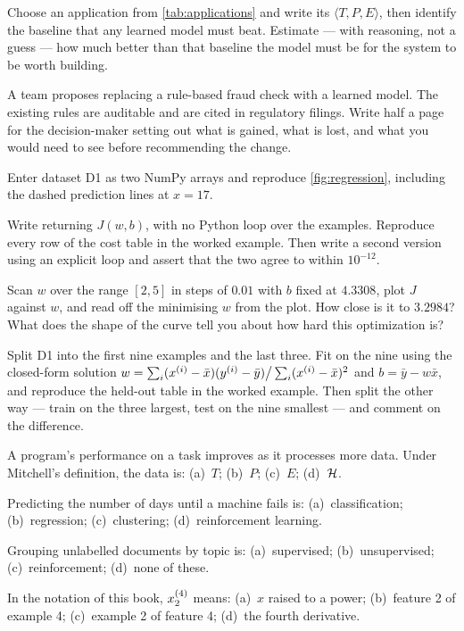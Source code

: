 \dpr Choose an application from \cref{tab:applications} and write its
$\langle T, P, E\rangle$, then identify the baseline that any learned model must
beat. Estimate --- with reasoning, not a guess --- how much better than that
baseline the model must be for the system to be worth building.

\dpr A team proposes replacing a rule-based fraud check with a learned model.
The existing rules are auditable and are cited in regulatory filings. Write half
a page for the decision-maker setting out what is gained, what is lost, and what
you would need to see before recommending the change.


\pe Enter dataset D1 as two NumPy arrays and reproduce \cref{fig:regression},
including the dashed prediction lines at $x = 17$.

\pe Write  returning $J(w,b)$, with no Python loop over
the examples. Reproduce every row of the cost table in the worked example. Then
write a second version using an explicit loop and assert that the two agree to
within $10^{-12}$.

\pe Scan $w$ over the range $[2, 5]$ in steps of $0.01$ with $b$ fixed at
$4.3308$, plot $J$ against $w$, and read off the minimising $w$ from the plot.
How close is it to $3.2984$? What does the shape of the curve tell you about how
hard this optimization is?

\pe Split D1 into the first nine examples and the last three. Fit on the nine
using the closed-form solution
$w = \sum_i (x^{(i)}-\bar x)(y^{(i)}-\bar y) \big/ \sum_i (x^{(i)}-\bar x)^2$
and $b = \bar y - w\bar x$, and reproduce the held-out table in the worked
example. Then split the other way --- train on the three largest, test on the
nine smallest --- and comment on the difference.


\qz A program's performance on a task improves as it processes more data. Under
Mitchell's definition, the data is: (a)~$T$; (b)~$P$; (c)~$E$; (d)~$\mathcal{H}$.

\qz Predicting the number of days until a machine fails is: (a)~classification;
(b)~regression; (c)~clustering; (d)~reinforcement learning.

\qz Grouping unlabelled documents by topic is: (a)~supervised;
(b)~unsupervised; (c)~reinforcement; (d)~none of these.

\qz In the notation of this book, $x^{(4)}_{2}$ means: (a)~$x$ raised to a power;
(b)~feature 2 of example 4; (c)~example 2 of feature 4; (d)~the fourth
derivative.

